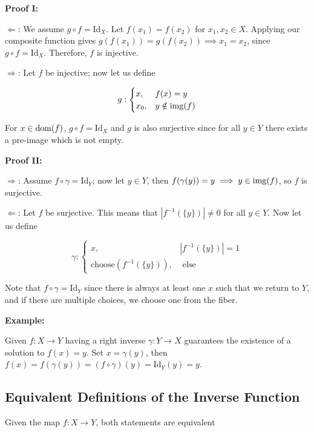 \textbf{Proof I:}

\(\Leftarrow\): We assume \(g \circ f = \mathrm{Id}_X\). Let \(f(x_1) = f(x_2)\) for \(x_1, x_2 \in X\). Applying our composite function gives
\(g(f(x_1)) = g(f(x_2)) \implies x_1 = x_2\), since \(g \circ f = \mathrm{Id}_X\). Therefore, \(f\) is injective.

\(\Rightarrow\): Let \(f\) be injective; now let us define

\[
	g:
	\begin{cases}
		x,   & f(x) = y         \\
		x_0, & y \notin \mathrm{img}(f)
	\end{cases}
\]

For \(x \in \mathrm{dom}(f)\), \(g \circ f = \mathrm{Id}_X\) and \(g\) is also surjective since for all \(y \in Y\) there exists a pre-image which is not empty.

\QED

\textbf{Proof II:}

\(\Rightarrow\): Assume \(f \circ \gamma = \mathrm{Id}_Y\); now let \(y \in Y\), then \(f(\gamma(y)) = y \implies y \in \mathrm{img}(f)\), so \(f\) is
surjective.

\(\Leftarrow\): Let \(f\) be surjective. This means that \(|f^{-1}(\{y\})| \neq 0\) for all \(y \in Y\). Now let us define

\[
	\gamma:
	\begin{cases}
		x,                              & |f^{-1}(\{y\})| = 1 \\
		\mathrm{choose}(f^{-1}(\{y\})), & \text{ else }
	\end{cases}
\]


Note that \(f \circ \gamma = \mathrm{Id}_Y\) since there is always at least one \(x\) such that we return to \(Y\), and if there are multiple choices,
we choose one from the fiber.

\QED

\textbf{Example:}

Given \(f: X \to Y\) having a right inverse \(\gamma: Y \to X\) guarantees the existence of a solution to \(f(x) = y\). Set \(x = \gamma(y)\), then
\(f(x) = f(\gamma(y)) = (f \circ \gamma)(y) = \text{Id}_Y(y) = y\).

\subsection{Equivalent Definitions of the Inverse Function}

Given the map \(f: X \to Y\), both statements are equivalent

